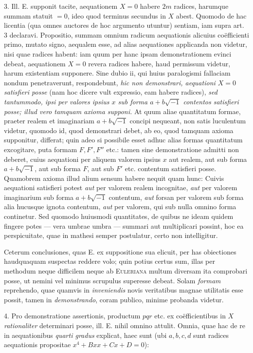 3. Ill. E. supponit tacite, aequationem $X=0$ habere $2m$ radices, harumque
summam statuit $=0$, ideo quod terminus secundus in $X$ abest. Quomodo
de hac licentia (qua omnes auctores de hoc argumento utuntur) sentiam, iam
supra art. 3 declaravi. Propositio, summam omnium radicum aequationis alicuius
coëfficienti primo, mutato signo, aequalem esse, ad alias aequationes applicanda
non videtur, nisi quae radices habent: iam quum per hanc ipsam demonstrationem
evinci debeat, aequationem $X=0$ revera radices habere, haud permissum
videtur, harum existentiam supponere. Sine dubio ii, qui huius paralogismi
fallaciam nondum penetraverunt, respondebunt, \textit{hic non demonstrari, aequationi
$X=0$ satisfieri posse} (nam hoc dicere vult expressio, eam habere radices),
\textit{sed tantummodo, ipsi per valores ipsius $x$ sub forma $a+b\sqrt{-1}$ contentos satisfieri
posse; illud vero tamquam axioma supponi.} At quum aliae quantitatum formae,
praeter realem et imaginariam $a+b\sqrt{-1}$ concipi nequeant, non satis luculentum
videtur, quomodo id, quod demonstrari debet, ab eo, quod tamquam axioma
supponitur, differat; quin adeo si possibile esset adhuc alias formas quantitatum
excogitare, puta formam $F,F',F''$ etc.: tamen sine demonstratione admitti non
deberet, cuius aequationi per aliquem valorem ipsius $x$ aut realem, aut sub forma
$a+b\sqrt{-1}$, aut sub forma $F$, aut sub $F'$ etc. contentum satisfieri posse. Quamobrem
axioma illud alium sensum habere nequit quam hunc: Cuivis aequationi
satisfieri potest \textit{aut} per valorem realem incognitae, \textit{aut} per valorem imaginarium
sub forma $a+b\sqrt{-1}$ contentum, \textit{aut} forsan per valorem sub forma alia hucusque
ignota contentum, \textit{aut} per valorem, qui sub nulla omnino forma continetur.
Sed quomodo huiusmodi quantitates, de quibus ne ideam quidem fingere potes
--- vera umbrae umbra --- summari aut multiplicari possint, hoc ea perspicuitate,
quae in mathesi semper postulatur, certo non intelligitur.

Ceterum conclusiones, quas E. ex suppositione sua elicuit, per has obiectiones
haudquaquam suspectas reddere volo; quin potius certus sum, illas per methodum
neque difficilem neque ab \textsc{Euleriana} multum diversam ita comprobari
posse, ut nemini vel minimus scrupulus superesse debeat. Solam \textit{formam} reprehendo,
quae quamvis in \textit{inveniendis} novis veritatibus magnae utilitatis esse possit,
tamen in \textit{demonstrando}, coram publico, minime probanda videtur.

4. Pro demonstratione assertionis, productum $pqr$ etc. ex coëfficientibus
in $X$ \textit{rationaliter} determinari posse, ill. E. nihil omnino attulit. Omnia, quae
hac de re in aequationibus \textit{quarti gradus} explicat, haec sunt (ubi $a,b,c,d$ sunt
radices aequationis propositae $x^4+Bxx+Cx+D=0$):

